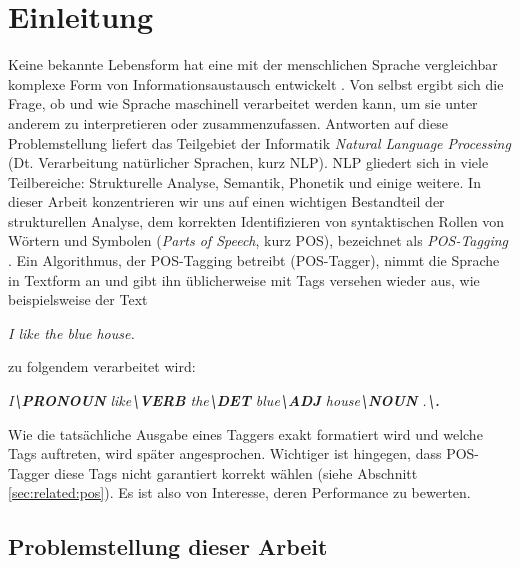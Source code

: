 %
\chapter{Einleitung}
\label{sec:intro}




Keine bekannte Lebensform hat eine mit der menschlichen Sprache vergleichbar komplexe Form von Informationsaustausch entwickelt \cite{Rao}. Von selbst ergibt sich die Frage, ob und wie Sprache maschinell verarbeitet werden kann, um sie unter anderem zu interpretieren oder zusammenzufassen. Antworten auf diese Problemstellung liefert das Teilgebiet der Informatik \textit{Natural Language Processing} (Dt. Verarbeitung natürlicher Sprachen, kurz NLP). NLP gliedert sich in viele Teilbereiche: Strukturelle Analyse, Semantik, Phonetik und einige weitere. In dieser Arbeit konzentrieren wir uns auf einen wichtigen Bestandteil der strukturellen Analyse, dem korrekten Identifizieren von syntaktischen Rollen von Wörtern und Symbolen (\textit{Parts of Speech}, kurz POS), bezeichnet als \textit{POS-Tagging} \cite{Smith}.
\newline
Ein Algorithmus, der POS-Tagging betreibt (POS-Tagger), nimmt die Sprache in Textform an und gibt ihn üblicherweise mit Tags versehen wieder aus, wie beispielsweise der Text
\newline \newline
\centerline{\textit{I like the blue house.}}
	
 zu folgendem verarbeitet wird:
\newline \newline
\centerline{\textit{I\textbf{\textbackslash PRONOUN} like\textbf{\textbackslash VERB} the\textbf{\textbackslash DET} blue\textbf{\textbackslash ADJ} house\textbf{\textbackslash NOUN} .\textbf{\textbackslash .}}}

Wie die tatsächliche Ausgabe eines Taggers exakt formatiert wird und welche Tags auftreten, wird später angesprochen. Wichtiger ist hingegen, dass POS-Tagger diese Tags nicht garantiert korrekt wählen (siehe Abschnitt \ref{sec:related:pos}). Es ist also von Interesse, deren Performance zu bewerten.


\section{Problemstellung dieser Arbeit}
\label{sec:intro:task}


